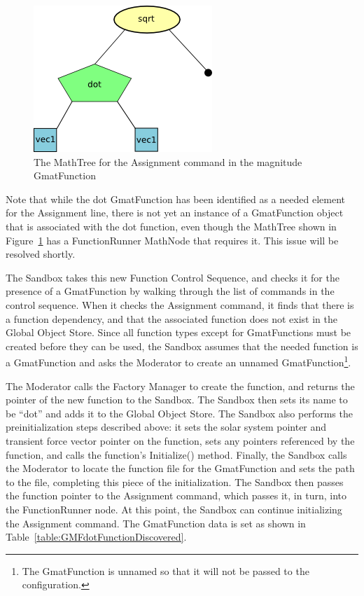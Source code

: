 \begin{figure}[htb]
\begin{center}
\includegraphics[170,140]{Images/DotMathTreeExample.png}
\caption{\label{figure:DotFunMathTree}The MathTree for the Assignment command in the magnitude
GmatFunction}
\end{center}
\end{figure}

Note that while the dot GmatFunction has been identified as a needed element for the Assignment
line, there is not yet an instance of a GmatFunction object that is associated with the dot
function, even though the MathTree shown in Figure~\ref{figure:DotFunMathTree} has a FunctionRunner
MathNode that requires it.  This issue will be resolved shortly.

The Sandbox takes this new Function Control Sequence, and checks it for the presence of a
GmatFunction by walking through the list of commands in the control sequence.  When it checks the
Assignment command, it finds that there is a function dependency, and that the associated function
does not exist in the Global Object Store.  Since all function types except for GmatFunctions must
be created before they can be used, the Sandbox assumes that the needed function is a GmatFunction
and asks the Moderator to create an unnamed GmatFunction\footnote{The GmatFunction is unnamed so
that it will not be passed to the configuration.}.

The Moderator calls the Factory Manager to create the function, and returns the pointer of the new
function to the Sandbox.  The Sandbox then sets its name to be ``dot'' and adds it to the Global
Object Store.  The Sandbox also performs the preinitialization steps described above: it sets the
solar system pointer and transient force vector pointer on the function, sets any pointers
referenced by the function, and calls the function's Initialize() method.  Finally, the Sandbox
calls the Moderator to locate the function file for the GmatFunction and sets the path to the file,
completing this piece of the initialization.  The Sandbox then passes the function pointer to the
Assignment command, which passes it, in turn, into the FunctionRunner node.  At this point, the
Sandbox can continue initializing the Assignment command.  The GmatFunction data is set as
shown in Table~\ref{table:GMFdotFunctionDiscovered}.

